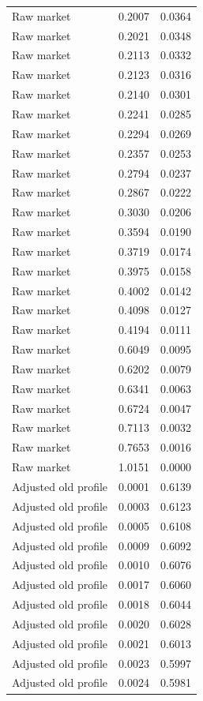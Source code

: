 \begin{table}[htbp]
\begin{tabular}{lll}
Raw market & 0.2007 & 0.0364 \\
Raw market & 0.2021 & 0.0348 \\
Raw market & 0.2113 & 0.0332 \\
Raw market & 0.2123 & 0.0316 \\
Raw market & 0.2140 & 0.0301 \\
Raw market & 0.2241 & 0.0285 \\
Raw market & 0.2294 & 0.0269 \\
Raw market & 0.2357 & 0.0253 \\
Raw market & 0.2794 & 0.0237 \\
Raw market & 0.2867 & 0.0222 \\
Raw market & 0.3030 & 0.0206 \\
Raw market & 0.3594 & 0.0190 \\
Raw market & 0.3719 & 0.0174 \\
Raw market & 0.3975 & 0.0158 \\
Raw market & 0.4002 & 0.0142 \\
Raw market & 0.4098 & 0.0127 \\
Raw market & 0.4194 & 0.0111 \\
Raw market & 0.6049 & 0.0095 \\
Raw market & 0.6202 & 0.0079 \\
Raw market & 0.6341 & 0.0063 \\
Raw market & 0.6724 & 0.0047 \\
Raw market & 0.7113 & 0.0032 \\
Raw market & 0.7653 & 0.0016 \\
Raw market & 1.0151 & 0.0000 \\
Adjusted old profile & 0.0001 & 0.6139 \\
Adjusted old profile & 0.0003 & 0.6123 \\
Adjusted old profile & 0.0005 & 0.6108 \\
Adjusted old profile & 0.0009 & 0.6092 \\
Adjusted old profile & 0.0010 & 0.6076 \\
Adjusted old profile & 0.0017 & 0.6060 \\
Adjusted old profile & 0.0018 & 0.6044 \\
Adjusted old profile & 0.0020 & 0.6028 \\
Adjusted old profile & 0.0021 & 0.6013 \\
Adjusted old profile & 0.0023 & 0.5997 \\
Adjusted old profile & 0.0024 & 0.5981 \\

\end{tabular}
\end{table}
